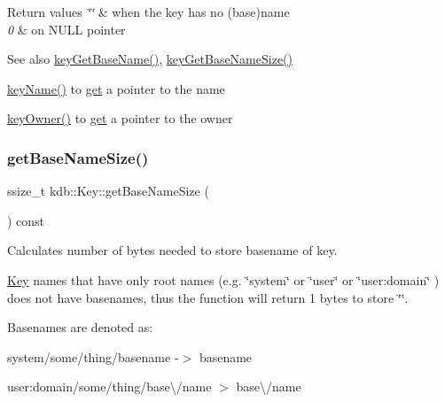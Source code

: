 \begin{DoxyRetVals}{Return values}
{\em \char`\"{}\char`\"{}} & when the key has no (base)name \\
\hline
{\em 0} & on N\+U\+LL pointer \\
\hline
\end{DoxyRetVals}
\begin{DoxySeeAlso}{See also}
\mbox{\hyperlink{group__keyname_ga0992d26bcfca767cb8e77053a483eb64}{key\+Get\+Base\+Name()}}, \mbox{\hyperlink{group__keyname_ga1a0b76c5d9e5367c7e72211e6c63d43a}{key\+Get\+Base\+Name\+Size()}} 

\mbox{\hyperlink{group__keyname_ga8e805c726a60da921d3736cda7813513}{key\+Name()}} to \mbox{\hyperlink{classkdb_1_1Key_ac558a1f1b2cb50d77fbabcbb24950c05}{get}} a pointer to the name 

\mbox{\hyperlink{owner_8c_af6485fb8599714b6bbd830cf915ffea5}{key\+Owner()}} to \mbox{\hyperlink{classkdb_1_1Key_ac558a1f1b2cb50d77fbabcbb24950c05}{get}} a pointer to the owner 
\end{DoxySeeAlso}
\mbox{\label{classkdb_1_1Key_aef3cc0ef1621b91718604e899b43ebc0}} 
\subsubsection{\texorpdfstring{getBaseNameSize()}{getBaseNameSize()}}
{\footnotesize\ttfamily ssize\+\_\+t kdb\+::\+Key\+::get\+Base\+Name\+Size (\begin{DoxyParamCaption}{ }\end{DoxyParamCaption}) const\hspace{0.3cm}{\ttfamily [inline]}}



Calculates number of bytes needed to store basename of {\ttfamily key}. 

\mbox{\hyperlink{classkdb_1_1Key}{Key}} names that have only root names (e.\+g. {\ttfamily \char`\"{}system\char`\"{}} or {\ttfamily \char`\"{}user\char`\"{}} or {\ttfamily \char`\"{}user\+:domain\char`\"{}} ) does not have basenames, thus the function will return 1 bytes to store \char`\"{}\char`\"{}.

Basenames are denoted as\+:
\begin{DoxyItemize}
\item {\ttfamily system/some/thing/basename} -\/$>$ {\ttfamily basename} 
\item {\ttfamily user\+:domain/some/thing/base\textbackslash{}/name} $>$ {\ttfamily base\textbackslash{}/name} 
\end{DoxyItemize}


